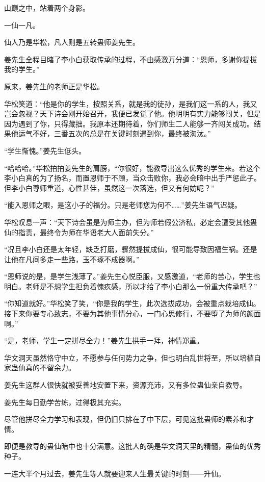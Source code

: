 \begin{this_body}
山巅之中，站着两个身影。

一仙一凡。

仙人乃是华松，凡人则是五转蛊师姜先生。

姜先生全程目睹了李小白获取传承的过程，不由感激万分道：“恩师，多谢你提拔我的学生。”

原来，姜先生的老师正是华松。

华松笑道：“他是你的学生，按照关系，就是我的徒孙，是我们这一系的人，我又岂会忽视？天下诗会刚开始召开，我便已发觉了他。他明明有实力能够闯关，但是因为遇到了你，只得藏拙。我原本还期待着，你们师生二人能够一齐闯关成功。结果他运气不好，三番五次的总是在关键时刻遇到你，最终被淘汰。”

“学生惭愧。”姜先生低头。

“哈哈哈。”华松拍拍姜先生的肩膀，“你很好，能教导出这么优秀的学生来。若这个李小白真的为了扬名，而置恩师于不顾，当众击败你，我必会暗中出手严惩此子。但李小白尊师重道，心性甚佳，虽然这一次落选，但又有何妨呢？”

“能入恩师之眼，是这小子的福分。只是老师您为何不……”姜先生语气迟疑。

华松叹息一声：“天下诗会虽是为师主办，但为师若假公济私，必定会遭受其他蛊仙的指责，最终令为师在华语老大人面前失分。”

“况且李小白还是太年轻，缺乏打磨，骤然提拔成仙，很可能导致因福生祸。还是让他在凡间多走一些路，玉不琢不成器啊。”

“恩师说的是，是学生浅薄了。”姜先生心悦臣服，又感激道，“老师的苦心，学生也明白。老师是不想学生担负着愧疚感，所以才给了李小白那么一份重大传承吧？”

“你知道就好。”华松笑了笑，“你是我的学生，此次选拔成功，会被重点栽培成仙。接下来你要专心致志，不要为其他事情分心，一门心思修行，不要堕了为师的颜面啊。”

“是，老师，学生一定拼尽全力！”姜先生拱手一拜，神情郑重。

华文洞天虽然恪守中立，不愿参与任何势力之争，但也明白乱世将至，所以培植自家蛊仙真的不留余力。

姜先生这群人很快就被妥善地安置下来，资源充沛，又有多位蛊仙亲自教导。

姜先生每日勤学苦练，过得极其充实。

尽管他拼尽全力学习和表现，但仍旧只排在了中下层，可见这批蛊师的素养和才情。

即便是教导的蛊仙暗中也十分满意。这批人的确是华文洞天里的精髓，蛊仙的优秀种子。

一连大半个月过去，姜先生等人就要迎来人生最关键的时刻——升仙。


\end{this_body}
